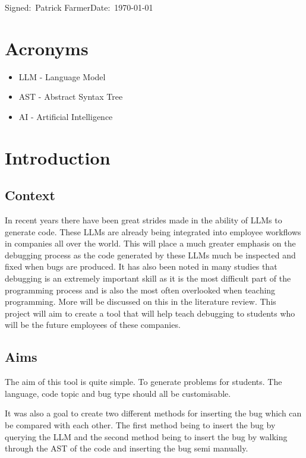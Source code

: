 \documentclass[12pt]{extarticle}
\begin{document}
\small Signed:~Patrick Farmer\hfill Date:~\today

\newpage
\tableofcontents

\newpage
\section{Acronyms}

\begin{itemize}
    \item LLM - Language Model
    \item AST - Abstract Syntax Tree
    \item AI - Artificial Intelligence
\end{itemize}

\section{Introduction}

\subsection{Context}

In recent years there have been great strides made in the ability of LLMs to generate code. These LLMs are already being integrated into employee workflows in companies all over the world. This will place a much greater emphasis on the debugging process as the code generated by these LLMs much be inspected and fixed when bugs are produced. It has also been noted in many studies that debugging is an extremely important skill as it is the most difficult part of the programming process and is also the most often overlooked when teaching programming. More will be discussed on this in the literature review. This project will aim to create a tool that will help teach debugging to students who will be the future employees of these companies. 

\subsection{Aims}

The aim of this tool is quite simple. To generate problems for students. The language, code topic and bug type should all be customisable. 

It was also a goal to create two different methods for inserting the bug which can be compared with each other. The first method being to insert the bug by querying the LLM and the second method being to insert the bug by walking through the AST of the code and inserting the bug semi manually.
\end{document}
